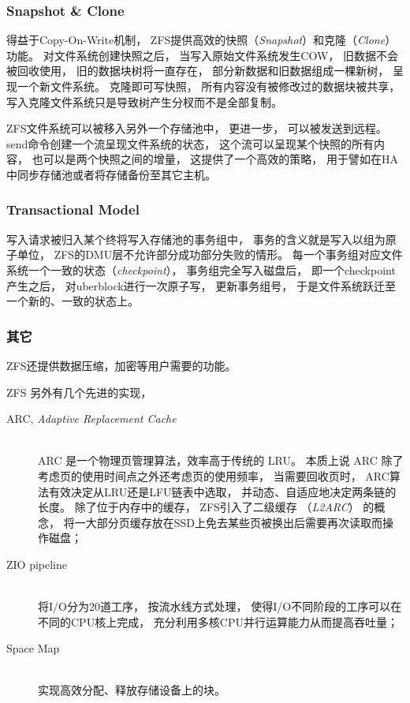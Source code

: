 \subsubsection{Snapshot \& Clone}
得益于Copy-On-Write机制，
ZFS提供高效的快照（{\em Snapshot}）和克隆（{\em Clone}）功能。
对文件系统创建快照之后，
当写入原始文件系统发生COW，
旧数据不会被回收使用，
旧的数据块树将一直存在，
部分新数据和旧数据组成一棵新树，
呈现一个新文件系统。
克隆即可写快照，
所有内容没有被修改过的数据块被共享，
写入克隆文件系统只是导致树产生分杈而不是全部复制。

ZFS文件系统可以被移入另外一个存储池中，
更进一步，
可以被发送到远程。
send命令创建一个流呈现文件系统的状态，
这个流可以呈现某个快照的所有内容，
也可以是两个快照之间的增量，
这提供了一个高效的策略，
用于譬如在HA中同步存储池或者将存储备份至其它主机。

\subsubsection{Transactional Model}
写入请求被归入某个终将写入存储池的事务组中，
事务的含义就是写入以组为原子单位，
ZFS的DMU层不允许部分成功部分失败的情形。
每一个事务组对应文件系统一个一致的状态（{\em checkpoint}），
事务组完全写入磁盘后，
即一个checkpoint产生之后，
对uberblock进行一次原子写，
更新事务组号，
于是文件系统跃迁至一个新的、一致的状态上。

\subsubsection{其它}
ZFS还提供数据压缩，加密等用户需要的功能。

ZFS 另外有几个先进的实现，
\begin{description}
  \item[ARC, {\em Adaptive Replacement Cache}]\hfill\\
    ARC 是一个物理页管理算法，效率高于传统的 LRU。
    本质上说 ARC 除了考虑页的使用时间点之外还考虑页的使用频率，
    当需要回收页时，
    ARC算法有效决定从LRU还是LFU链表中选取，
    并动态、自适应地决定两条链的长度。
    除了位于内存中的缓存，
    ZFS引入了二级缓存 （{\em L2ARC}） 的概念，
    将一大部分页缓存放在SSD上免去某些页被换出后需要再次读取而操作磁盘；
  \item[ZIO pipeline]\hfill\\
    将I/O分为20道工序，
    按流水线方式处理，
    使得I/O不同阶段的工序可以在不同的CPU核上完成，
    充分利用多核CPU并行运算能力从而提高吞吐量；
  \item[Space Map]\hfill\\
    实现高效分配、释放存储设备上的块。
\end{description}

